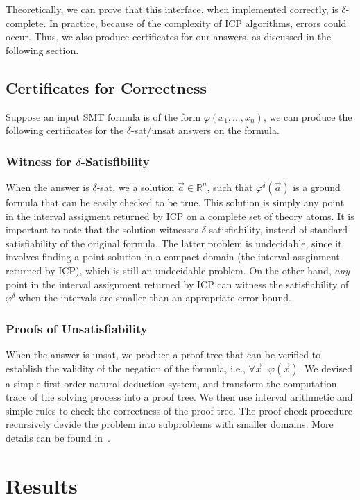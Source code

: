 \documentclass[envcountsect]{llncs}
\begin{document}
Theoretically, we can prove that this interface, when implemented correctly, is
$\delta$-complete. In practice, because of the complexity of ICP algorithms,
errors could occur. Thus, we also produce certificates for our answers, as
discussed in the following section.

\subsection{Certificates for Correctness}

Suppose an input SMT formula is of the form $\varphi(x_1,...,x_n)$, we can
produce the following certificates for the {\sf $\delta$-sat/unsat} answers on
the formula.

\subsubsection{Witness for $\delta$-Satisfibility} When the answer is
{\sf $\delta$-sat}, we a solution $\vec a\in \mathbb{R}^n$, such
that $\varphi^{\delta}(\vec a)$ is a ground formula that can be easily checked
to be true. This solution is simply any point in the interval assigment returned
by ICP on a complete set of theory atoms. It is important to note that the
solution witnesses $\delta$-satisfiability, instead of standard satisfiability
of the original formula. The latter problem is undecidable, since it involves
finding a point solution in a compact domain (the interval assginment returned
by ICP), which is still an undecidable problem. On the other hand, {\em any}
point in the interval assignment returned by ICP can witness the satisfiability
of $\varphi^{\delta}$ when the intervals are smaller than an appropriate error
bound.

\subsubsection{Proofs of Unsatisfiability} When the answer is {\sf unsat}, we
produce a proof tree that can be verified to establish the validity of the
negation of the formula, i.e., $\forall \vec x \neg\varphi(\vec x)$. We
devised a simple first-order natural deduction system, and transform the
computation trace of the solving process into a proof tree. We then use
interval arithmetic and simple rules to check the correctness of the proof
tree. The proof check procedure recursively devide the problem into subproblems
with smaller domains. More details can be found in~\cite{}.

\section{Results}
\end{document}
